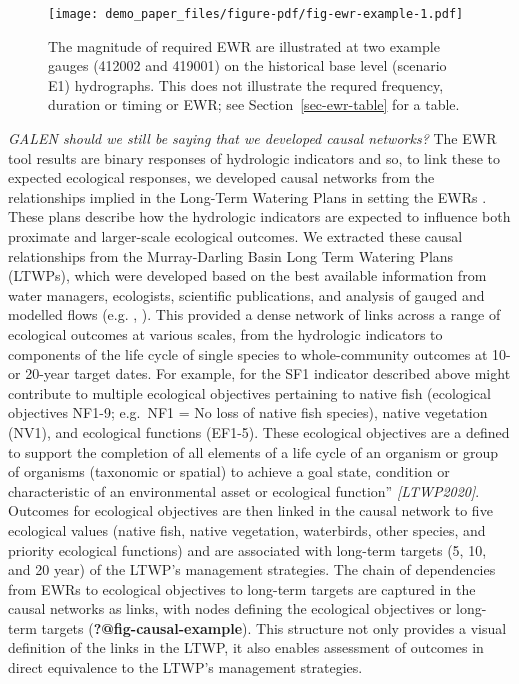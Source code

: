 \documentclass[
  number]{elsarticle}
\begin{document}
\begin{figure}

{\centering \texttt{[image: demo\_paper\_files/figure-pdf/fig-ewr-example-1.pdf]}

}

\caption{\label{fig-ewr-example}The magnitude of required EWR are
illustrated at two example gauges (412002 and 419001) on the historical
base level (scenario E1) hydrographs. This does not illustrate the
requred frequency, duration or timing or EWR; see
Section~\ref{sec-ewr-table} for a table.}

\end{figure}

\emph{GALEN should we still be saying that we developed causal
networks?} The EWR tool results are binary responses of hydrologic
indicators and so, to link these to expected ecological responses, we
developed causal networks from the relationships implied in the
Long-Term Watering Plans in setting the EWRs \citep{DPIE2020abc}. These
plans describe how the hydrologic indicators are expected to influence
both proximate and larger-scale ecological outcomes. We extracted these
causal relationships from the Murray-Darling Basin Long Term Watering
Plans (LTWPs), which were developed based on the best available
information from water managers, ecologists, scientific publications,
and analysis of gauged and modelled flows (e.g.
\citep{nswdepartmentofplanningandenvironment2020},
\citep{lobegeiger2022}). This provided a dense network of links across a
range of ecological outcomes at various scales, from the hydrologic
indicators to components of the life cycle of single species to
whole-community outcomes at 10- or 20-year target dates. For example,
for the SF1 indicator described above might contribute to multiple
ecological objectives pertaining to native fish (ecological objectives
NF1-9; e.g.~NF1 = No loss of native fish species), native vegetation
(NV1), and ecological functions (EF1-5). These ecological objectives are
a defined to support the completion of all elements of a life cycle of
an organism or group of organisms (taxonomic or spatial) to achieve a
goal state, condition or characteristic of an environmental asset or
ecological function'' \emph{{[}LTWP2020{]}}. Outcomes for ecological
objectives are then linked in the causal network to five ecological
values (native fish, native vegetation, waterbirds, other species, and
priority ecological functions) and are associated with long-term targets
(5, 10, and 20 year) of the LTWP's management strategies. The chain of
dependencies from EWRs to ecological objectives to long-term targets are
captured in the causal networks as links, with nodes defining the
ecological objectives or long-term targets
(\textbf{?@fig-causal-example}). This structure not only provides a
visual definition of the links in the LTWP, it also enables assessment
of outcomes in direct equivalence to the LTWP's management strategies.
\end{document}
